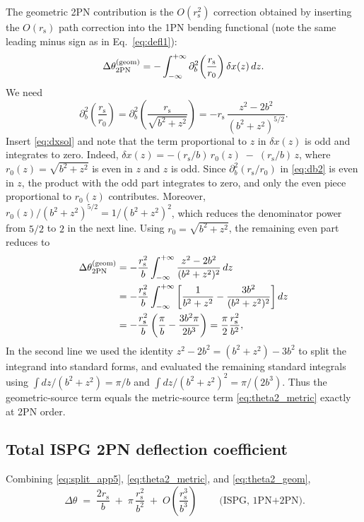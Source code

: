 \documentclass[11pt]{article}
\newcommand{\rs}{r_{\mathrm{s}}}
\begin{document}
The geometric 2PN contribution is the $O(\rs^2)$ correction obtained by inserting the $O(\rs)$ path correction into the 1PN bending functional (note the same leading minus sign as in Eq.~\eqref{eq:defl1}):
\begin{equation}
\Delta\theta_{2{\rm PN}}^{\rm (geom)}
=-\int_{-\infty}^{+\infty}\partial_b^2\!\left(\frac{\rs}{r_0}\right)\delta x(z)\,dz.
\label{eq:geomdef}
\end{equation}
We need
\begin{equation}
\partial_b^2\!\left(\frac{\rs}{r_0}\right)
=\partial_b^2\!\left(\frac{\rs}{\sqrt{b^2+z^2}}\right)
=-\rs\,\frac{z^2-2b^2}{(b^2+z^2)^{5/2}}.
\label{eq:db2}
\end{equation}
Insert \eqref{eq:dxsol} and note that the term proportional to $z$ in $\delta x(z)$ is odd and integrates to zero. Indeed, $\delta x(z)=-(\rs/b)\,r_0(z)\;-\;(\rs/b)\,z$, where $r_0(z)=\sqrt{b^2+z^2}$ is even in $z$ and $z$ is odd. Since $\partial_b^2(\rs/r_0)$ in \eqref{eq:db2} is even in $z$, the product with the odd part integrates to zero, and only the even piece proportional to $r_0(z)$ contributes. Moreover, $r_0(z)/(b^2+z^2)^{5/2}=1/(b^2+z^2)^2$, which reduces the denominator power from $5/2$ to $2$ in the next line. Using $r_0=\sqrt{b^2+z^2}$, the remaining even part reduces to
\begin{align}
\Delta\theta_{2{\rm PN}}^{\rm (geom)}
&=-\frac{\rs^2}{b}\int_{-\infty}^{+\infty}\frac{z^2-2b^2}{(b^2+z^2)^2}\,dz \nonumber\\
&=-\frac{\rs^2}{b}\int_{-\infty}^{+\infty}\left[\frac{1}{b^2+z^2}-\frac{3b^2}{(b^2+z^2)^2}\right]dz \nonumber\\
&=-\frac{\rs^2}{b}\left(\frac{\pi}{b}-\frac{3b^2\pi}{2b^3}\right)
=\frac{\pi}{2}\frac{\rs^2}{b^2},
\label{eq:theta2_geom}
\end{align}
In the second line we used the identity $z^2-2b^2=(b^2+z^2)-3b^2$ to split the integrand into standard forms, and evaluated the remaining standard integrals using $\int dz/(b^2+z^2)=\pi/b$ and $\int dz/(b^2+z^2)^2=\pi/(2b^3)$. Thus the geometric-source term equals the metric-source term \eqref{eq:theta2_metric} exactly at 2PN order.


\subsection{Total ISPG 2PN deflection coefficient}\label{sec:total}
Combining \eqref{eq:split_app5}, \eqref{eq:theta2_metric}, and \eqref{eq:theta2_geom},
\begin{equation}
\boxed{\ \Delta\theta \;=\; \frac{2\rs}{b}\;+\;\pi\,\frac{\rs^2}{b^2}\;+\;O\!\left(\frac{\rs^3}{b^3}\right)\ }
\qquad \text{(ISPG, 1PN+2PN)}.
\label{eq:theta_total}
\end{equation}
\end{document}
